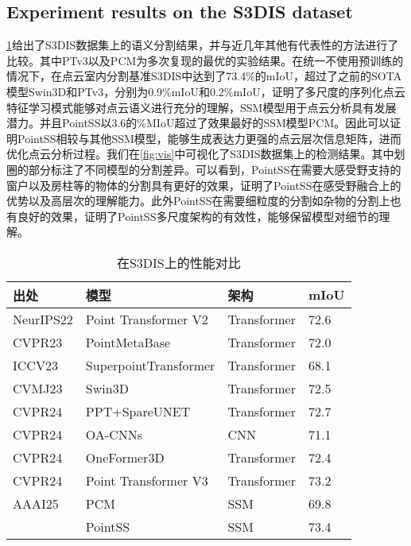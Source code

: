 \documentclass[preprint,12pt]{elsarticle}
\begin{document}
\subsection{Experiment results on the S3DIS dataset}
\cref{tab:s3dis}给出了S3DIS数据集上的语义分割结果，并与近几年其他有代表性的方法进行了比较。其中PTv3以及PCM为多次复现的最优的实验结果。在统一不使用预训练的情况下，在点云室内分割基准S3DIS中达到了73.4\%的mIoU，超过了之前的SOTA模型Swin3D和PTv3，分别为0.9\%mIoU和0.2\%mIoU，证明了多尺度的序列化点云特征学习模式能够对点云语义进行充分的理解，SSM模型用于点云分析具有发展潜力。并且PointSS以3.6的\%MIoU超过了效果最好的SSM模型PCM。因此可以证明PointSS相较与其他SSM模型，能够生成表达力更强的点云层次信息矩阵，进而优化点云分析过程。我们在\cref{fig:vis}中可视化了S3DIS数据集上的检测结果。其中划圈的部分标注了不同模型的分割差异。可以看到，PointSS在需要大感受野支持的窗户以及房柱等的物体的分割具有更好的效果，证明了PointSS在感受野融合上的优势以及高层次的理解能力。此外PointSS在需要细粒度的分割如杂物的分割上也有良好的效果，证明了PointSS多尺度架构的有效性，能够保留模型对细节的理解。
\begin{table}[htbp!]
	\caption{在S3DIS上的性能对比}
\label{tab:s3dis}
	\begin{tabular}{@{}llll@{}}
		\toprule
		\textbf{出处}  & \textbf{模型}           & \textbf{架构} & \textbf{mIoU} \\ \midrule
		NeurIPS22 & Point Transformer V2\cite{ptv2}  & Transformer & 72.6          \\
		CVPR23     & PointMetaBase\cite{pmb}         & Transformer & 72.0          \\
		ICCV23     & SuperpointTransformer\cite{spt} & Transformer & 68.1          \\
		CVMJ23     & Swin3D\cite{Swin3D}                & Transformer & 72.5          \\
		CVPR24     & PPT+SpareUNET\cite{ppt}         & Transformer & 72.7          \\
		CVPR24     & OA-CNNs\cite{oacnn}               & CNN         & 71.1          \\
		CVPR24     & OneFormer3D\cite{OneFormer3D}           & Transformer & 72.4          \\
		CVPR24     & Point Transformer V3\cite{ptv3}           & Transformer & 73.2          \\
		AAAI25    & PCM\cite{pcm}                   & SSM         & 69.8         \\
		& PointSS               &SSM           & 73.4          \\ \bottomrule
	\end{tabular}
		\centering
	

\end{table}
\end{document}

